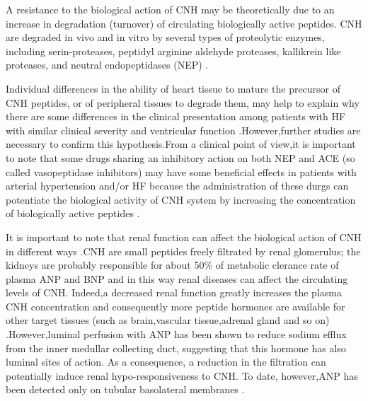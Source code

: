 \documentclass[14pt,a4paper,onecolumn]{extarticle}
\begin{document}
A resistance to the biological action of CNH may be theoretically due to an increase in degradation (turnover) of circulating biologically active peptides. CNH are degraded in vivo and in vitro by several types of proteolytic enzymes, including serin-proteases, peptidyl arginine aldehyde proteases, kallikrein like proteases, and neutral endopeptidases (NEP) \citep{bib35} \citep{bib36} \citep{bib318} \citep{bib334} \citep{bib335} \citep{bib336} \citep{bib337} \citep{bib338}.

Individual differences in the ability of heart tissue to mature the precursor of CNH peptides, or of peripheral tissues to degrade them, may help to explain why there are some differences in the clinical presentation among patients with HF with similar clinical severity and ventricular function \citep{bib36}.However,further studies are necessary to confirm this hypothesis.From a clinical point of view,it is important to note that some drugs sharing an inhibitory action on both NEP and ACE (so called vasopeptidase inhibitors) may have some beneficial effects in patients with arterial hypertension and/or HF because the administration of these durgs can potentiate the biological activity of CNH system by increasing the concentration of biologically active peptides \citep{bib339} \citep{bib340} \citep{bib341} \citep{bib342}.

It is important to note that renal function can affect the biological action of CNH in different ways .CNH are small peptides freely filtrated by renal glomerulus; the kidneys are probably responsible for about 50\% of metabolic clerance rate of plasma ANP and BNP and in this way renal diseases can affect the circulating levels of CNH.  Indeed,a decreased renal function greatly increases the plasma CNH concentration and consequently more peptide hormones are available for other target tissues (such as brain,vascular tissue,adrenal gland and so on) \citep{bib35}.However,luminal perfusion with ANP has been shown to reduce sodium efflux from the inner medullar collecting duct, suggesting that this hormone has also luminal sites of action.  As a consequence, a reduction in the filtration can potentially induce renal hypo-responsiveness to CNH. To date, however,ANP has been detected only on tubular basolateral membranes \citep{bib325}. %
\end{document}
